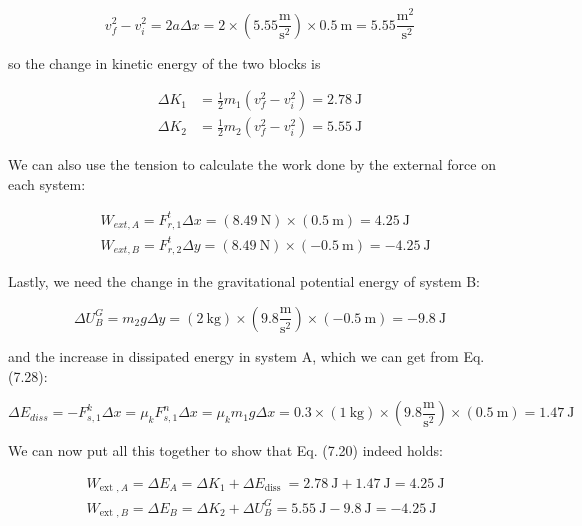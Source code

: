 \documentclass[10pt]{article}
\begin{document}
\begin{equation*}
v_{f}^{2}-v_{i}^{2}=2 a \Delta x=2 \times\left(5.55 \frac{\mathrm{m}}{\mathrm{s}^{2}}\right) \times 0.5 \mathrm{~m}=5.55 \frac{\mathrm{m}^{2}}{\mathrm{~s}^{2}} \tag{7.35}
\end{equation*}


so the change in kinetic energy of the two blocks is


\begin{align*}
\Delta K_{1} & =\frac{1}{2} m_{1}\left(v_{f}^{2}-v_{i}^{2}\right)=2.78 \mathrm{~J} \\
\Delta K_{2} & =\frac{1}{2} m_{2}\left(v_{f}^{2}-v_{i}^{2}\right)=5.55 \mathrm{~J} \tag{7.36}
\end{align*}


We can also use the tension to calculate the work done by the external force on each system:


\begin{align*}
& W_{e x t, A}=F_{r, 1}^{t} \Delta x=(8.49 \mathrm{~N}) \times(0.5 \mathrm{~m})=4.25 \mathrm{~J} \\
& W_{e x t, B}=F_{r, 2}^{t} \Delta y=(8.49 \mathrm{~N}) \times(-0.5 \mathrm{~m})=-4.25 \mathrm{~J} \tag{7.37}
\end{align*}


Lastly, we need the change in the gravitational potential energy of system B:


\begin{equation*}
\Delta U_{B}^{G}=m_{2} g \Delta y=(2 \mathrm{~kg}) \times\left(9.8 \frac{\mathrm{m}}{\mathrm{s}^{2}}\right) \times(-0.5 \mathrm{~m})=-9.8 \mathrm{~J} \tag{7.38}
\end{equation*}


and the increase in dissipated energy in system A, which we can get from Eq. (7.28):


\begin{equation*}
\Delta E_{d i s s}=-F_{s, 1}^{k} \Delta x=\mu_{k} F_{s, 1}^{n} \Delta x=\mu_{k} m_{1} g \Delta x=0.3 \times(1 \mathrm{~kg}) \times\left(9.8 \frac{\mathrm{m}}{\mathrm{s}^{2}}\right) \times(0.5 \mathrm{~m})=1.47 \mathrm{~J} \tag{7.39}
\end{equation*}


We can now put all this together to show that Eq. (7.20) indeed holds:


\begin{align*}
& W_{\text {ext }, A}=\Delta E_{A}=\Delta K_{1}+\Delta E_{\text {diss }}=2.78 \mathrm{~J}+1.47 \mathrm{~J}=4.25 \mathrm{~J} \\
& W_{\text {ext }, B}=\Delta E_{B}=\Delta K_{2}+\Delta U_{B}^{G}=5.55 \mathrm{~J}-9.8 \mathrm{~J}=-4.25 \mathrm{~J} \tag{7.40}
\end{align*}
\end{document}

